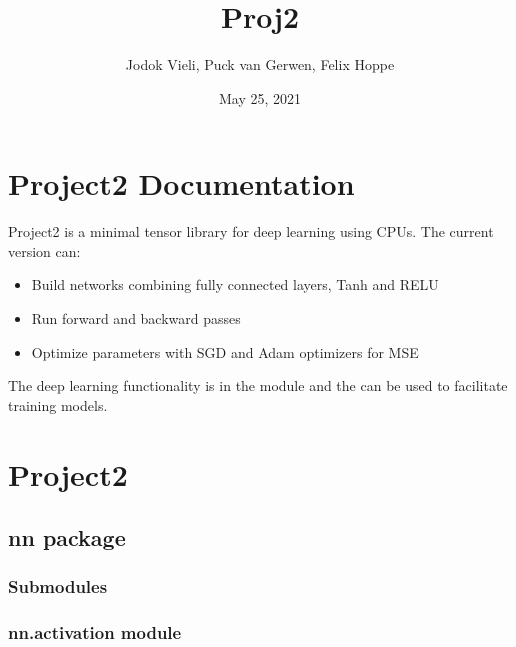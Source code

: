 \documentclass[letterpaper,10pt,english,openany,oneside]{sphinxmanual}
\title{Proj2}
\date{May 25, 2021}
\author{Jodok Vieli, Puck van Gerwen, Felix Hoppe}
\begin{document}
\pagestyle{empty}
\sphinxmaketitle
\pagestyle{plain}
\sphinxtableofcontents
\pagestyle{normal}
\label{\detokenize{index::doc}}



\section{Project2 Documentation}
\label{\detokenize{readme_link:project2-documentation}}\label{\detokenize{readme_link::doc}}
Project2 is a minimal tensor library for deep learning using CPUs. The current version can:
\begin{itemize}
\item {} 
Build networks combining fully connected layers, Tanh and RELU

\item {} 
Run forward and backward passes

\item {} 
Optimize parameters with SGD and Adam optimizers for MSE

\end{itemize}

The deep learning functionality is in the  module and the  can be used to facilitate training models.


\section{Project2}
\label{\detokenize{modules:project2}}\label{\detokenize{modules::doc}}

\subsection{nn package}
\label{\detokenize{nn:nn-package}}\label{\detokenize{nn::doc}}

\subsubsection{Submodules}
\label{\detokenize{nn:submodules}}

\subsubsection{nn.activation module}
\label{\detokenize{nn:module-nn.activation}}\label{\detokenize{nn:nn-activation-module}}
\end{document}
